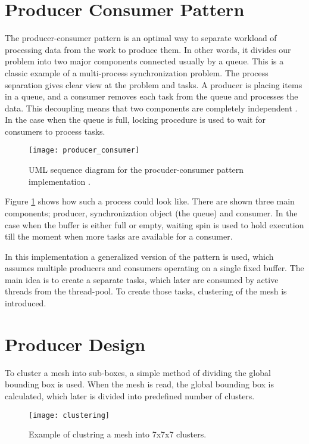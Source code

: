 \section{Producer Consumer Pattern}

The producer-consumer pattern is an optimal way to separate workload of processing data from the work to produce them. In other words, it divides our problem into two major components connected usually by a queue. This is a classic example of a multi-process synchronization problem. The process separation gives clear view at the problem and tasks. A producer is placing items in a queue, and a consumer removes each task from the queue and processes the data. This decoupling means that two components are completely independent \cite{grand02}. In the case when the queue is full, locking procedure is used to wait for consumers to process tasks.

\begin{figure}[H]
  \begin{center}
    \texttt{[image: producer\_consumer]}
    \caption{UML sequence diagram for the procuder-consumer pattern implementation \cite{ropero17}.}
    \label{fig:uml}
  \end{center}
\end{figure}

Figure \ref{fig:uml} shows how such a process could look like. There are shown three main components; producer, synchronization object (the queue) and consumer. In the case when the buffer is either full or empty, waiting spin is used to hold execution till the moment when more tasks are available for a consumer.

In this implementation a generalized version of the pattern is used, which assumes multiple producers and consumers operating on a single fixed buffer. The main idea is to create a separate tasks, which later are consumed by active threads from the thread-pool. To create those tasks, clustering of the mesh is introduced.

\newpage
\section{Producer Design}

To cluster a mesh into sub-boxes, a simple method of dividing the global bounding box is used. When the mesh is read, the global bounding box is calculated, which later is divided into predefined number of clusters.

\begin{figure}[H]
  \begin{center}
    \texttt{[image: clustering]}
    \caption{Example of clustring a mesh into 7x7x7 clusters.}
    \label{fig:clustering}
  \end{center}
\end{figure}

